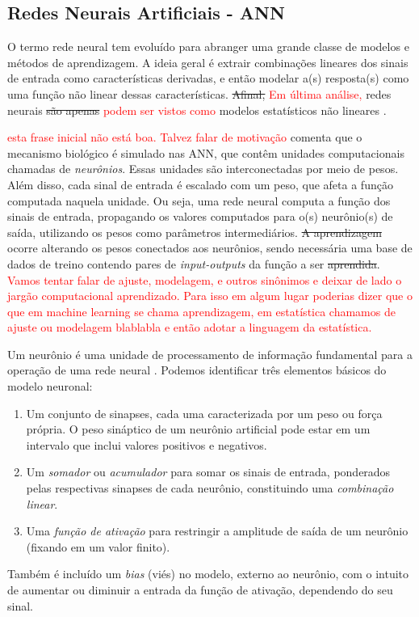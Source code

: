 \documentclass{automatextcc}
\newcommand{\pumi}[1]{\textcolor{red}{#1}}
\begin{document}
\subsection{Redes Neurais Artificiais - ANN}
O termo rede neural tem evoluído para abranger uma grande classe de modelos e métodos de aprendizagem. A ideia geral é extrair combinações lineares dos sinais de entrada como características derivadas, e então modelar a(s) resposta(s) como uma função não linear dessas características. \sout{Afinal,} \pumi{Em última análise, } redes neurais \sout{são apenas} \pumi{podem ser vistos como} modelos estatísticos não lineares \citep{statsLearning2009}.

\pumi{esta frase inicial não está boa. Talvez falar de motivação }\citet{aggarwal2018DeepLearning} comenta que o mecanismo biológico é simulado nas ANN, que contêm unidades computacionais chamadas de \textit{neurônios}. Essas unidades são interconectadas por meio de pesos. Além disso, cada sinal de entrada é escalado com um peso, que afeta a função computada naquela unidade. Ou seja, uma rede neural computa a função dos sinais de entrada, propagando os valores computados para o(s) neurônio(s) de saída, utilizando os pesos como parâmetros intermediários. \sout{A aprendizagem} ocorre alterando os pesos conectados aos neurônios, sendo necessária uma base de dados de treino contendo pares de \textit{input-outputs} da função a ser \sout{aprendida}. \pumi{Vamos tentar falar de ajuste, modelagem, e outros sinônimos e deixar de lado o jargão computacional aprendizado. Para isso em algum lugar poderias dizer que o que em machine learning se chama aprendizagem, em estatística chamamos de ajuste ou modelagem blablabla e então adotar a linguagem da estatística.}

Um neurônio é uma unidade de processamento de informação fundamental para a operação de uma rede neural \citep{haykin2001redesneurais}. Podemos identificar três elementos básicos do modelo neuronal:
\begin{enumerate}
    \item Um conjunto de sinapses, cada uma caracterizada por um peso ou força própria. O peso sináptico de um neurônio artificial pode estar em um intervalo que inclui valores positivos e negativos.
    \item Um \textit{somador} ou \textit{acumulador} para somar os sinais de entrada, ponderados pelas respectivas sinapses de cada neurônio, constituindo uma \textit{combinação linear}.
    \item Uma \textit{função de ativação} para restringir a amplitude de saída de um neurônio (fixando em um valor finito).
\end{enumerate}
Também é incluído um \textit{bias} (viés) no modelo, externo ao neurônio, com o intuito de aumentar ou diminuir a entrada da função de ativação, dependendo do seu sinal.
\end{document}
